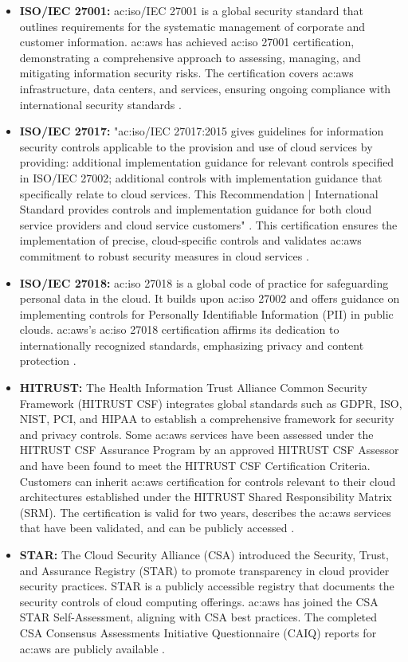 \begin{itemize}
    \item \textbf{ISO/IEC 27001:} \gls{ac:iso}/IEC 27001 is a global security standard that outlines requirements for the systematic management of corporate and customer information. \gls{ac:aws} has achieved \gls{ac:iso} 27001 certification, demonstrating a comprehensive approach to assessing, managing, and mitigating information security risks. The certification covers \gls{ac:aws} infrastructure, data centers, and services, ensuring ongoing compliance with international security standards \cite{ISOIEC27001}.
    \item \textbf{ISO/IEC 27017:} "\gls{ac:iso}/IEC 27017:2015 gives guidelines for information security controls applicable to the provision and use of cloud services by providing: additional implementation guidance for relevant controls specified in ISO/IEC 27002; additional controls with implementation guidance that specifically relate to cloud services. This Recommendation | International Standard provides controls and implementation guidance for both cloud service providers and cloud service customers" \cite{ISOIEC27017}. This certification ensures the implementation of precise, cloud-specific controls and validates \gls{ac:aws} commitment to robust security measures in cloud services \cite{AWSISOIEC27017}.
    \item \textbf{ISO/IEC 27018:} \gls{ac:iso} 27018 is a global code of practice for safeguarding personal data in the cloud. It builds upon \gls{ac:iso} 27002 and offers guidance on implementing controls for Personally Identifiable Information (PII) in public clouds. \gls{ac:aws}'s \gls{ac:iso} 27018 certification affirms its dedication to internationally recognized standards, emphasizing privacy and content protection \cite{AWSISOIEC27018}.
    \item \textbf{HITRUST:} The Health Information Trust Alliance Common Security Framework (HITRUST CSF) integrates global standards such as GDPR, ISO, NIST, PCI, and HIPAA to establish a comprehensive framework for security and privacy controls. Some \gls{ac:aws} services have been assessed under the HITRUST CSF Assurance Program by an approved HITRUST CSF Assessor and have been found to meet the HITRUST CSF Certification Criteria.  Customers can inherit \gls{ac:aws} certification for controls relevant to their cloud architectures established under the HITRUST Shared Responsibility Matrix (SRM). The certification is valid for two years, describes the \gls{ac:aws} services that have been validated, and can be publicly accessed \cite{AWSHITRUSTCSF}.
    \item \textbf{STAR:} The Cloud Security Alliance (CSA) introduced the Security, Trust, and Assurance Registry (STAR) to promote transparency in cloud provider security practices. STAR is a publicly accessible registry that documents the security controls of cloud computing offerings. \gls{ac:aws} has joined the CSA STAR Self-Assessment, aligning with CSA best practices. The completed CSA Consensus Assessments Initiative Questionnaire (CAIQ) reports for \gls{ac:aws} are publicly available \cite{AWSCSA}.
\end{itemize}

